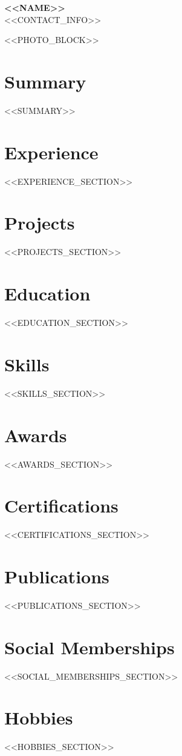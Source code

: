 \documentclass[<<FONT_SIZE>>,a4paper]{article}
\begin{document}
\noindent
\begin{minipage}[c]{0.75\textwidth}
    {\Huge \textbf{<<NAME>>}} \\[1.5ex]
    {<<CONTACT_INFO>>}
\end{minipage}%
\begin{minipage}[c]{0.25\textwidth}
    \begin{flushright}
        <<PHOTO_BLOCK>>
    \end{flushright}
\end{minipage}

\vspace{4mm}

\section*{Summary}
<<SUMMARY>>

\section*{Experience}
<<EXPERIENCE_SECTION>>

\section*{Projects}
<<PROJECTS_SECTION>>

\section*{Education}
<<EDUCATION_SECTION>>

\section*{Skills}
<<SKILLS_SECTION>>

\section*{Awards}
<<AWARDS_SECTION>>

\section*{Certifications}
<<CERTIFICATIONS_SECTION>>

\section*{Publications}
<<PUBLICATIONS_SECTION>>

\section*{Social Memberships}
<<SOCIAL_MEMBERSHIPS_SECTION>>

\section*{Hobbies}
<<HOBBIES_SECTION>>
\end{document}
